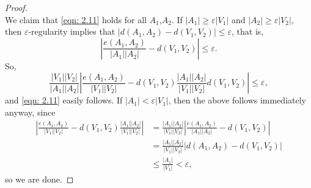 \begin{proof}
\begin{equation}
				\end{equation}
				We claim that \eqref{eqn: 2.11} holds for all $A_1$,$A_2$. If $|A_1| \ge \varepsilon|V_1|$ and $|A_2|\ge\varepsilon|V_2|$, then $\varepsilon$-regularity implies that $|d(A_1,A_2) - d(V_1,V_2)| \le \varepsilon$, that is,
				\[ \left| \frac{e(A_1,A_2)}{|A_1||A_2|} - d(V_1,V_2) \right| \le \varepsilon. \]
				So,
				\[ \frac{|V_1||V_2|}{|A_1||A_2|} \left| \frac{e(A_1,A_2)}{|V_1||V_2|} - d(V_1,V_2) \frac{|A_1||A_2|}{|V_1||V_2|} d(V_1,V_2) \right| \le \varepsilon, \]
				and \eqref{eqn: 2.11} easily follows. If $|A_1| < \varepsilon|V_1|$, then the above follows immediately anyway, since
				\begin{align*}
					\left| \frac{e(A_1,A_2)}{|V_1||V_2|} - d(V_1,V_2) \frac{|A_1||A_2|}{|V_1||V_2|} \right| &= \frac{|A_1||A_2|}{|V_1||V_2|} \left| \frac{e(A_1,A_2)}{|A_1||A_2|} - d(V_1,V_2) \right| \\
					&= \frac{|A_1||A_2|}{|V_1||V_2|} \left| d(A_1,A_2) - d(V_1,V_2) \right| \\
					&\le \frac{|A_1|}{|V_1|} < \varepsilon,
				\end{align*}
				so we are done.
			\end{proof}